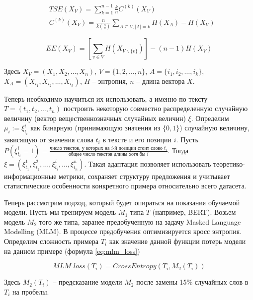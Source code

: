 \documentclass{spbau-diploma}
\begin{document}
\begin{equation} \label{eq:tse}
\begin{split}
	& TSE(X_V) = \sum\limits_{k=1}^{n-1}\frac{k}{n}C^{(k)}(X_V) \\
	& C^{(k)}(X_V) = \frac{n}{k\binom{n}{k}}\sum\limits_{A\subseteq V,|A|=k}H(X_A) - H(X_V)
\end{split}
\end{equation}

\begin{equation} \label{eq:ee}
EE(X_V) = \left[\sum\limits_{v\in V}H(X_{V\backslash\{v\}})\right] - (n - 1)H(X_V)
\end{equation}

Здесь $X_V = \left(X_1,X_2,\ldots,X_n\right)$, $V = \{1,2,\ldots,n\}$, $A=\{i_1,i_2,\ldots,i_k\}$, $X_A = \left(X_{i_1},X_{i_2},\ldots,X_{i_k}\right)$, $H$ -- энтропия, $n$ -- длина вектора $X$.

Теперь необходимо научиться их использовать, а именно по тексту $T=(t_1,t_2,\ldots,t_n)$ построить некоторую совместно распределенную случайную величину (вектор вещественнозначных случайных величин) $\xi$. Определим $\mu_i := \xi_{t_i}^{i}$ как бинарную (принимающую значения из $\{0, 1\}$) случайную величину, зависящую от значения слова $t_i$ в тексте и его позиции $i$. Пусть $P(\xi_{t_i}^i = 1) = \frac{\text{число текстов, у которых на } i \text{-й позиции стоит слово } t_i}{\text{общее число текстов длины хотя бы }i}$. Тогда $\xi = (\xi_{t_1}^1,\xi_{t_2}^2,\ldots,\xi_{t_i}^i,\ldots,\xi_{t_n}^n)$. Такая адаптация позволяет использовать теоретико-информационные метрики, сохраняет структуру предложения и учитывает статистические особенности конкретного примера относительно всего датасета.

Теперь рассмотрим подход, который будет опираться на показания обучаемой модели. Пусть мы тренируем модель $M_1$ типа $T$ (например, BERT). Возьем модель $M_2$ того же типа, заранее предобученную на задачу Masked Language Modelling (MLM). В процессе предобучения оптимизируется кросс энтропия. Определим сложность примера $T_i$ как значение данной функции потерь модели на данном примере (формула \ref{eq:mlm_loss})

\begin{equation} \label{eq:mlm_loss}
MLM\_loss(T_i) = CrossEntropy(T_i, M_2(T_i))
\end{equation}

Здесь $M_2(T_i)$ -- предсказание модели $M_2$ после замены 15\% случайных слов в $T_i$ на пробелы.
\end{document}

